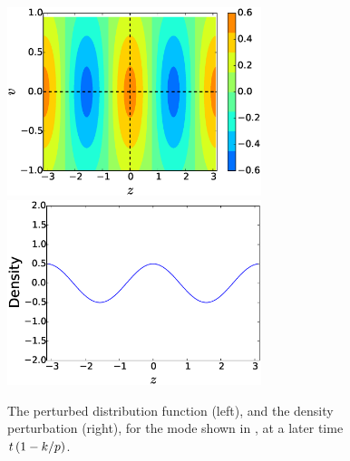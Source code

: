      \begin{figure}
     \begin{center}
        \includegraphics[width=7.4cm]{figs/intro/phmix_echot8.eps}
        \includegraphics[width=7.4cm]{figs/intro/denstecho8.eps}
        \caption{The perturbed distribution function (left), and the density perturbation
        (right), for the mode shown in , at a later time
        $t \left(1-k/p\right)$.}
        \label{intro:fig:echo:tt}
     \end{center}
     \end{figure}
     
